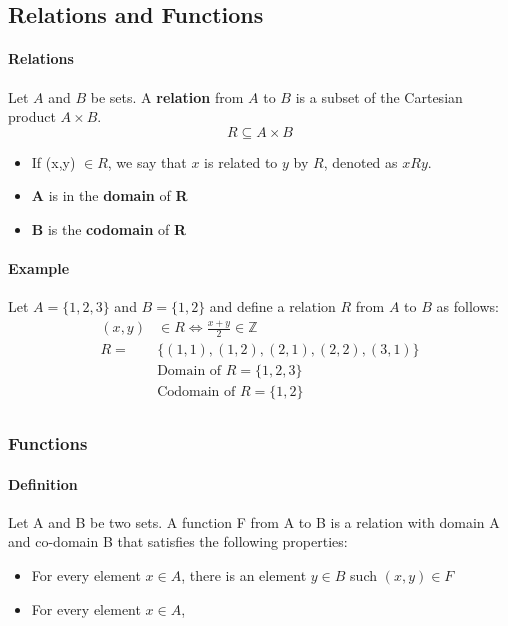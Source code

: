 \subsection{Relations and Functions}

\paragraph*{Relations}
Let $A$ and $B$ be sets. A \textbf{relation} from $A$ to $B$ is a subset of the Cartesian product $A\times B$.\\
\begin{equation*}
    R \subseteq A\times B
\end{equation*}
\begin{itemize}
    \item If (x,y) $\in R$, we say that $x$ is related to $y$ by $R$, denoted as $xRy$.
    \item \textbf{A} is in the \textbf{domain} of \textbf{R}
    \item \textbf{B} is the \textbf{codomain} of \textbf{R}
\end{itemize}

\paragraph*{Example}
Let $A = \{1,2,3\}$ and $B = \{1,2\}$ and define a relation $R$ from $A$ to $B$ as follows:
\begin{align*}
    (x,y) &\in R \iff \frac{x+y}{2} \in \mathbb{Z}\\
    R = &\{(1,1), (1,2), (2,1), (2,2), (3,1)\}\\
        &\text{Domain of } R = \{1,2,3\}\\
        &\text{Codomain of } R = \{1,2\}\\
\end{align*}

\subsubsection*{Functions}
\paragraph*{Definition}
Let A and B be two sets. A function F from A to B is a relation with domain A and co-domain B that satisfies the following properties:
\begin{itemize}
    \item For every element $x \in A$, there is an element $y \in B$ such $(x,y) \in F$
    \item For every element $x \in A$,
\end{itemize}
\pagebreak
